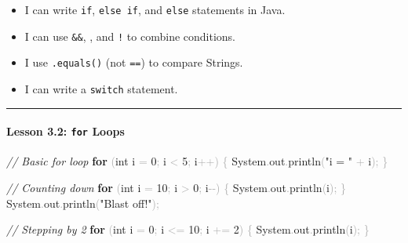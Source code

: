\documentclass[
  justified,
  openright,
]{tufte-book}
\let\subsection\paragraph
\let\paragraph\paragraph
\newcommand{\KeywordTok}[1]{\textcolor{CodeKeyword}{\textbf{#1}}}  %
\newcommand{\StringTok}[1]{\textcolor{CodeString}{#1}}              %
\newcommand{\CommentTok}[1]{\textcolor{CodeComment}{\textit{#1}}}  %
\newcommand{\CodeNumTok}[1]{\textcolor{CodeNumber}{#1}}             %
\newcommand{\CodeFuncTok}[1]{\textcolor{CodeKeyword}{#1}}           %
\newcommand{\CodeTypeTok}[1]{\textcolor{CodeType}{#1}}              %
\newcommand{\OperatorTok}[1]{\textcolor{DarkGray}{#1}}              %
\newenvironment{Shaded}{%
  \begin{mdframed}[style=TufteCode]%
}{%
  \end{mdframed}%
}
\let\subsection\paragraph
\let\paragraph\paragraph
\providecommand{\tightlist}{%
  \setlength{\itemsep}{0pt}\setlength{\parskip}{0pt}}
\begin{document}
\begin{itemize}
\tightlist
\item[$\square$]
  I can write \texttt{if}, \texttt{else\ if}, and \texttt{else}
  statements in Java.
\item[$\square$]
  I can use \texttt{\&\&}, \texttt{\textbar{}\textbar{}}, and \texttt{!}
  to combine conditions.
\item[$\square$]
  I use \texttt{.equals()} (not \texttt{==}) to compare Strings.
\item[$\square$]
  I can write a \texttt{switch} statement.
\end{itemize}

\begin{center}\rule{0.5\linewidth}{0.5pt}\end{center}

\subsection{\texorpdfstring{Lesson 3.2: \texttt{for}
Loops}{Lesson 3.2: for Loops}}\label{lesson-3.2-for-loops-1}

\begin{Shaded}
\begin{Highlighting}[]
\CommentTok{// Basic for loop}
\KeywordTok{for} \OperatorTok{(}\CodeTypeTok{int} i \OperatorTok{=} \CodeNumTok{0}\OperatorTok{;} i \OperatorTok{\textless{}} \CodeNumTok{5}\OperatorTok{;} i\OperatorTok{++)} \OperatorTok{\{}
    System\OperatorTok{.}\CodeFuncTok{out}\OperatorTok{.}\CodeFuncTok{println}\OperatorTok{(}\StringTok{"i = "} \OperatorTok{+} i\OperatorTok{);}
\OperatorTok{\}}
 
\CommentTok{// Counting down}
\KeywordTok{for} \OperatorTok{(}\CodeTypeTok{int} i \OperatorTok{=} \CodeNumTok{10}\OperatorTok{;} i \OperatorTok{\textgreater{}} \CodeNumTok{0}\OperatorTok{;} i\OperatorTok{{-}{-})} \OperatorTok{\{}
    System\OperatorTok{.}\CodeFuncTok{out}\OperatorTok{.}\CodeFuncTok{println}\OperatorTok{(}i\OperatorTok{);}
\OperatorTok{\}}
System\OperatorTok{.}\CodeFuncTok{out}\OperatorTok{.}\CodeFuncTok{println}\OperatorTok{(}\StringTok{"Blast off!"}\OperatorTok{);}
 
\CommentTok{// Stepping by 2}
\KeywordTok{for} \OperatorTok{(}\CodeTypeTok{int} i \OperatorTok{=} \CodeNumTok{0}\OperatorTok{;} i \OperatorTok{\textless{}=} \CodeNumTok{10}\OperatorTok{;} i \OperatorTok{+=} \CodeNumTok{2}\OperatorTok{)} \OperatorTok{\{}
    System\OperatorTok{.}\CodeFuncTok{out}\OperatorTok{.}\CodeFuncTok{println}\OperatorTok{(}i\OperatorTok{);}
\OperatorTok{\}}
\end{Highlighting}
\end{Shaded}
\end{document}
